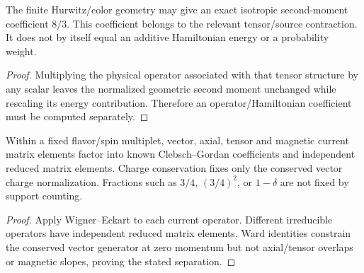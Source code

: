 \documentclass[12pt,a4paper]{article}
\begin{document}
\begin{lemma}
\label{p11:lem:minimal-transverse-spin-glue-sheet}

The finite Hurwitz/color geometry may give an exact isotropic second-moment coefficient \(8/3\).  This coefficient belongs to the relevant tensor/source contraction.  It does not by itself equal an additive Hamiltonian energy or a probability weight.
\label{p11:eq:minimal-transverse-spin-glue-weight}
\end{lemma}
\begin{proof}

Multiplying the physical operator associated with that tensor structure by any scalar leaves the normalized geometric second moment unchanged while rescaling its energy contribution.  Therefore an operator/Hamiltonian coefficient must be computed separately.
\end{proof}

\begin{lemma}
\label{p11:lem:dressed-determinant-current-projections}

Within a fixed flavor/spin multiplet, vector, axial, tensor and magnetic current matrix elements factor into known Clebsch--Gordan coefficients and independent reduced matrix elements.  Charge conservation fixes only the conserved vector charge normalization.  Fractions such as \(3/4\), \((3/4)^2\), or \(1-\delta\) are not fixed by support counting.
\label{p11:eq:dressed-determinant-current-projections}
\end{lemma}
\begin{proof}

Apply Wigner--Eckart to each current operator.  Different irreducible operators have independent reduced matrix elements.  Ward identities constrain the conserved vector generator at zero momentum but not axial/tensor overlaps or magnetic slopes, proving the stated separation.
\end{proof}
\end{document}
